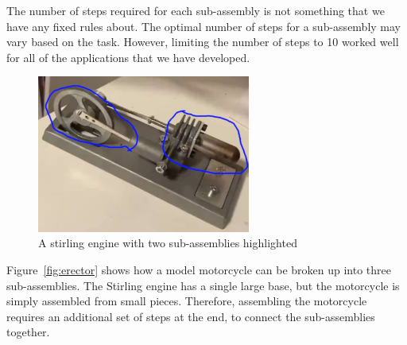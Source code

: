 The number of steps required for each sub-assembly is not something that we have
any fixed rules about.
The optimal number of steps for a sub-assembly may vary based on the task.
However, limiting the number of steps to 10 worked well for all of the
applications that we have developed.

\begin{figure}
  \includegraphics[width=7cm]{figures/stirling/full.png}
  \caption{A stirling engine with two sub-assemblies highlighted
  }\label{fig:stirling_full}
\end{figure}

Figure~\ref{fig:erector} shows how a model motorcycle can be broken up into
three sub-assemblies.
The Stirling engine has a single large base, but the motorcycle is simply
assembled from small pieces. Therefore, assembling the motorcycle requires
an additional set of steps at the end, to connect the sub-assemblies together.

